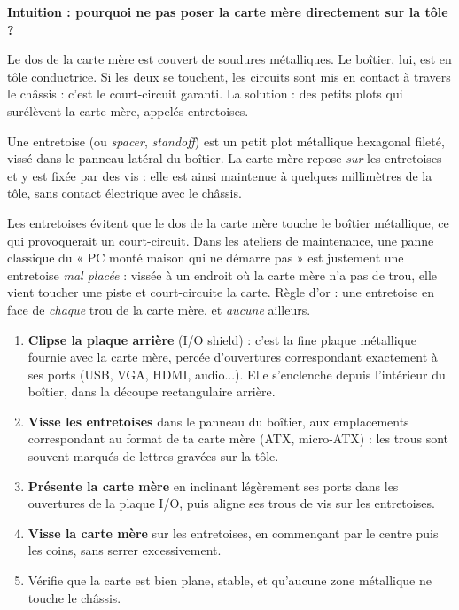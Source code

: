 \documentclass[11pt]{article}
\newcommand{\cle}[1]{{\popxbold\color{popdark}#1}}
\newcounter{popsec}
\newcounter{popsub}
\newcommand{\courssub}[1]{%
  \stepcounter{popsub}%
  \par\vspace{9pt}\noindent{\popxbold\fontsize{11.5}{13}\selectfont\color{popink}{\color{poporange}\thepopsec.\thepopsub}\hspace{6pt}#1}\par\nopagebreak\vspace{4pt}
}
\begin{document}
\courssub{Fixation de la carte mère dans le boîtier}

\textbf{Intuition : pourquoi ne pas poser la carte mère directement sur la tôle ?}

Le dos de la carte mère est couvert de soudures métalliques. Le boîtier, lui, est en tôle conductrice. Si les deux se touchent, les circuits sont mis en contact à travers le châssis : c'est le \cle{court-circuit} garanti. La solution : des petits plots qui surélèvent la carte mère, appelés \cle{entretoises}.

\begin{definition}[Entretoise]
Une \cle{entretoise} (ou \emph{spacer}, \emph{standoff}) est un petit plot métallique hexagonal fileté, vissé dans le panneau latéral du boîtier. La carte mère repose \emph{sur} les entretoises et y est fixée par des vis : elle est ainsi maintenue à quelques millimètres de la tôle, sans contact électrique avec le châssis.
\end{definition}

\begin{savaistu}
Les entretoises évitent que le dos de la carte mère touche le boîtier métallique, ce qui provoquerait un court-circuit. Dans les ateliers de maintenance, une panne classique du « PC monté maison qui ne démarre pas » est justement une entretoise \emph{mal placée} : vissée à un endroit où la carte mère n'a pas de trou, elle vient toucher une piste et court-circuite la carte. Règle d'or : une entretoise en face de \emph{chaque} trou de la carte mère, et \emph{aucune} ailleurs.
\end{savaistu}

\begin{methode}
\begin{enumerate}
\item \textbf{Clipse la plaque arrière} (\cle{I/O shield}) : c'est la fine plaque métallique fournie avec la carte mère, percée d'ouvertures correspondant exactement à ses ports (USB, VGA, HDMI, audio...). Elle s'enclenche depuis l'intérieur du boîtier, dans la découpe rectangulaire arrière.
\item \textbf{Visse les entretoises} dans le panneau du boîtier, aux emplacements correspondant au format de ta carte mère (ATX, micro-ATX) : les trous sont souvent marqués de lettres gravées sur la tôle.
\item \textbf{Présente la carte mère} en inclinant légèrement ses ports dans les ouvertures de la plaque I/O, puis aligne ses trous de vis sur les entretoises.
\item \textbf{Visse la carte mère} sur les entretoises, en commençant par le centre puis les coins, sans serrer excessivement.
\item Vérifie que la carte est bien plane, stable, et qu'aucune zone métallique ne touche le châssis.
\end{enumerate}
\end{methode}
\end{document}
